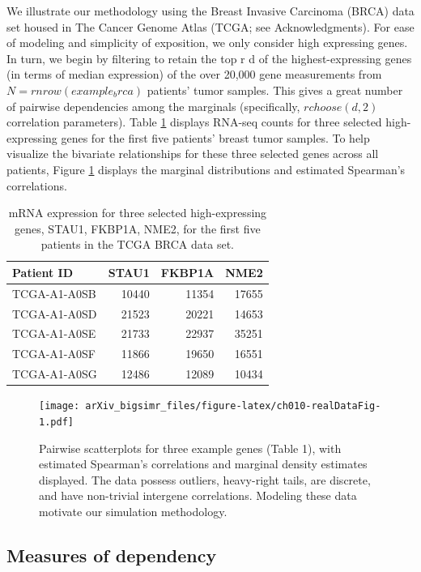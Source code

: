 \documentclass{article}
\begin{document}
We illustrate our methodology using the Breast Invasive Carcinoma (BRCA)
data set housed in The Cancer Genome Atlas (TCGA; see Acknowledgments).
For ease of modeling and simplicity of exposition, we only consider high
expressing genes. In turn, we begin by filtering to retain the top r d
of the highest-expressing genes (in terms of median expression) of the
over 20,000 gene measurements from \(N=r nrow(example_brca)\) patients'
tumor samples. This gives a great number of pairwise dependencies among
the marginals (specifically, \(r choose(d,2)\) correlation parameters).
Table \ref{tab:ch010-realDataTab} displays RNA-seq counts for three
selected high-expressing genes for the first five patients' breast tumor
samples. To help visualize the bivariate relationships for these three
selected genes across all patients, Figure \ref{fig:ch010-realDataFig}
displays the marginal distributions and estimated Spearman's
correlations.

\begin{table}

\caption{\label{tab:ch010-realDataTab}mRNA expression for three selected high-expressing genes, STAU1, FKBP1A, NME2, for the first five patients in the TCGA BRCA data set.}
\centering
\begin{tabular}[t]{lrrr}
\toprule
Patient ID & STAU1 & FKBP1A & NME2\\
\midrule
TCGA-A1-A0SB & 10440 & 11354 & 17655\\
TCGA-A1-A0SD & 21523 & 20221 & 14653\\
TCGA-A1-A0SE & 21733 & 22937 & 35251\\
TCGA-A1-A0SF & 11866 & 19650 & 16551\\
TCGA-A1-A0SG & 12486 & 12089 & 10434\\
\bottomrule
\end{tabular}
\end{table}

\begin{figure}
\centering
\texttt{[image: arXiv\_bigsimr\_files/figure-latex/ch010-realDataFig-1.pdf]}
\caption{\label{fig:ch010-realDataFig}Pairwise scatterplots for three
example genes (Table 1), with estimated Spearman's correlations and
marginal density estimates displayed. The data possess outliers,
heavy-right tails, are discrete, and have non-trivial intergene
correlations. Modeling these data motivate our simulation methodology.}
\end{figure}

\hypertarget{measures-of-dependency}{%
\subsection{Measures of dependency}\label{measures-of-dependency}}
\end{document}
